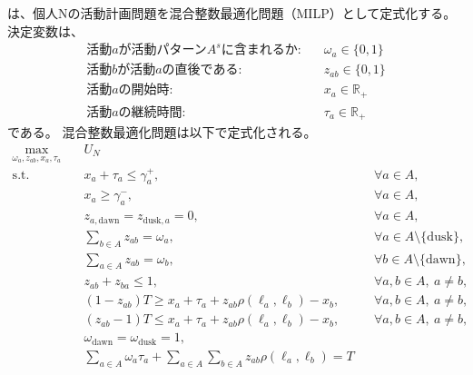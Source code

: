 \citet{pougala2023oasis}は、個人Nの活動計画問題を混合整数最適化問題（MILP）として定式化する。
決定変数は、
\begin{subequations}
\begin{align}
  \text{活動$a$が活動パターン$A^s$に含まれるか:}&\quad \omega_a \in \{0,1\}\label{dec:omega}\\
  \text{活動$b$が活動$a$の直後である:}&\quad z_{ab} \in \{0,1\}\label{dec:z}\\
  \text{活動$a$の開始時:}&\quad x_a \in \mathbb R_+\label{dec:x}\\
  \text{活動$a$の継続時間:}&\quad \tau_a \in \mathbb R_+\label{dec:tau}
\end{align}
\end{subequations}
である。
混合整数最適化問題は以下で定式化される。
\begin{subequations}
\begin{align}
 \max_{\omega_a, z_{ab}, x_a, \tau_a}\quad
 & U_N
 \label{eq:mf-oasis-objective}\\
 \mathrm{s.t.}\quad
 & x_a + \tau_a \leq \gamma_a^{+},
 && \forall a \in A,
 \label{eq:mf-oasis-time-window-upper}\\
 & x_a \geq \gamma_a^{-},
 && \forall a \in A,
 \label{eq:mf-oasis-time-window-lower}\\
 & z_{a,\mathrm{dawn}} = z_{\mathrm{dusk},a} = 0,
 && \forall a \in A,
 \label{eq:mf-oasis-boundary-arcs}\\
 & \sum_{b \in A} z_{ab} = \omega_a,
 && \forall a \in A \setminus \{\mathrm{dusk}\},
 \label{eq:mf-oasis-outgoing-flow}\\
 & \sum_{a \in A} z_{ab} = \omega_b,
 && \forall b \in A \setminus \{\mathrm{dawn}\},
 \label{eq:mf-oasis-incoming-flow}\\
 & z_{ab} + z_{ba} \leq 1,
 && \forall a,b \in A,\ a \neq b,
 \label{eq:mf-oasis-no-two-cycle}\\
 & (1-z_{ab})T \geq x_a + \tau_a
   + z_{ab}\rho(\ell_a,\ell_b) - x_b,
 && \forall a,b \in A,\ a \neq b,
 \label{eq:mf-oasis-time-link-upper}\\
 & (z_{ab}-1)T \leq x_a + \tau_a
   + z_{ab}\rho(\ell_a,\ell_b) - x_b,
 && \forall a,b \in A,\ a \neq b,
 \label{eq:mf-oasis-time-link-lower}\\
 & \omega_{\mathrm{dawn}} = \omega_{\mathrm{dusk}} = 1,
 \label{eq:mf-oasis-boundary-selection}\\
 & \sum_{a \in A}\omega_a\tau_a
  + \sum_{a \in A}\sum_{b \in A}
    z_{ab}\rho(\ell_a,\ell_b) = T
\label{eq:mf-oasis-optimization}
\end{align}
\end{subequations}
